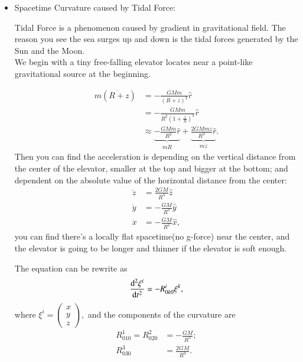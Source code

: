 \documentclass[openany,10pt]{book}
\theoremstyle{definition}
\theoremstyle{definition}
\theoremstyle{remark}
\begin{document}
\begin{itemize}
    \item Spacetime Curvature caused by Tidal Force:

Tidal Force is a phenomenon caused by gradient in gravitational field. The reason you see the sea surges up and down is the tidal forces generated by the Sun and the Moon.\\
We begin with a tiny free-falling elevator locates near a point-like gravitational source at the beginning.

\begin{equation}
\begin{aligned}
    m(\ddot{R+z})&=-\frac{GMm}{(R+z)^2}\hat{r}\\
    &=-\frac{GMm}{R^2\left(1+\frac{z}{R}\right)^2}\hat{r}\\
    &\approx{\underbrace{-\frac{GMm}{R^2}\hat{r}}_{m\ddot R}}+{\underbrace{\frac{2GMmz}{R^3}\hat{r}}_{m\ddot{z}}}.
    \end{aligned}
\end{equation}
Then you can find the acceleration is depending on the vertical distance from the center of the elevator, smaller at the top and bigger at the bottom; and dependent on the absolute value of the horizontal distance from the center:
\begin{equation}
\begin{aligned}
\ddot z  &=\frac{2GM}{R^3}\hat{z}\\
\ddot y  &=-\frac{GM}{R^3}\hat{y}\\
\ddot x  &=-\frac{GM}{R^3}\hat{x},
\end{aligned}
\end{equation}
you can find there's a locally flat spacetime(no g-force) near the center, and the elevator is going to be longer and thinner if the elevator is soft enough. 

The equation can be rewrite as
\begin{equation}
    \frac{{\rm d^2}\xi^i}{{\rm d}t^2}=-R_{0k0}^i\xi^k,
\end{equation}
where $
    \xi^i={\left(\begin{array}{cccc}
x\\
y\\
z
\end{array}
\right)},
$
and the components of the curvature are
\begin{equation}\begin{aligned}
    R_{010}^1=R_{020}^2&=-\frac{GM}{R^3};\\
    R_{030}^3&=\frac{2GM}{R^3}.
    \end{aligned}
\end{equation}



\end{itemize}
\end{document}

